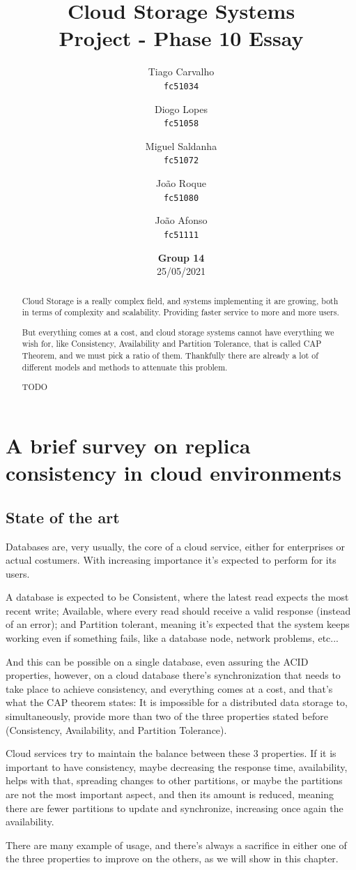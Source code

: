\documentclass[14pt,oneside]{extreport}
\title{\textbf{Cloud Storage Systems} \\
       \large Project - Phase 10 Essay}
\date{\textbf{Group 14} \\ 25/05/2021}
\author{
Tiago Carvalho    \\
\texttt{fc51034}  \and
Diogo Lopes       \\
\texttt{fc51058}  \and
Miguel Saldanha   \\ 
\texttt{fc51072}  \and
João Roque        \\ 
\texttt{fc51080}  \and
João Afonso       \\ 
\texttt{fc51111}
}
\newcommand*\fpar{\hspace{1ex}}
\begin{document}
\maketitle

\begin{abstract}
  \fpar Cloud Storage is a really complex field, and systems implementing it are growing, both in terms of complexity and scalability. Providing faster service to more and more users. 
  \par But everything comes at a cost, and cloud storage systems cannot have everything we wish for, like Consistency, Availability and Partition Tolerance, that is called CAP Theorem, and we must pick a ratio of them. Thankfully there are already a lot of different models and methods to attenuate this problem.
  \par TODO
\end{abstract}

\chapter{\Large{A brief survey on replica consistency in cloud environments \cite{paper1}}}
  \section{State of the art}
  \fpar Databases are, very usually, the core of a cloud service, either for enterprises or actual costumers. With increasing importance it's expected to perform for its users.
  \par A database is expected to be Consistent, where the latest read expects the most recent write; Available, where every read should receive a valid response (instead of an error); and Partition tolerant, meaning it's expected that the system keeps working even if something fails, like a database node, network problems, etc...
  \par And this can be possible on a single database, even assuring the ACID properties, however, on a cloud database there's synchronization that needs to take place to achieve consistency, and everything comes at a cost, and that's what the CAP theorem states: It is impossible for a distributed data storage to, simultaneously, provide more than two of the three properties stated before (Consistency, Availability, and Partition Tolerance).
  \par Cloud services try to maintain the balance between these 3 properties. If it is important to have consistency, maybe decreasing the response time, availability, helps with that, spreading changes to other partitions, or maybe the partitions are not the most important aspect, and then its amount is reduced, meaning there are fewer partitions to update and synchronize, increasing once again the availability.
  \par There are many example of usage, and there's always a sacrifice in either one of the three properties to improve on the others, as we will show in this chapter.
\end{document}
